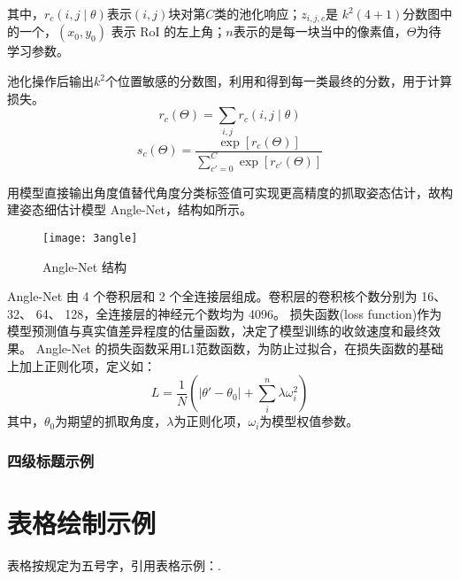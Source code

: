 其中，$r_c(i,j\mid\theta)$表示$ (i, j) $块对第$ C $类的池化响应；$z_{i,j,c}$是 $k^2(4 + 1)$分数图中的一个，$(x_0, y_0)$ 表示 RoI 的左上角；$n$表示的是每一块当中的像素值，$\Theta$为待学习参数。

池化操作后输出$k^2$个位置敏感的分数图，利用和得到每一类最终的分数，用于计算损失。
\begin{equation}
r_c(\Theta)=\sum_{i,j}r_c(i,j\mid\theta)
\label{eqrc}
\end{equation}
\begin{equation}
s_c(\Theta)=\dfrac{\exp[{r_c(\Theta)}]}{\sum\limits_{c'=0}^C\exp[{r_{c'}(\Theta)}]}
\label{eqsc}
\end{equation}

用模型直接输出角度值替代角度分类标签值可实现更高精度的抓取姿态估计，故构建姿态细估计模型 Angle-Net，结构如所示。

\begin{figure}[!htbp]
	\centering
	\texttt{[image: 3angle]}
	\caption{Angle-Net 结构}
     \label{figangle}
\end{figure}

Angle-Net 由 4 个卷积层和 2 个全连接层组成。卷积层的卷积核个数分别为 16、 32、 64、 128，全连接层的神经元个数均为 4096。 损失函数(loss function)作为模型预测值与真实值差异程度的估量函数，决定了模型训练的收敛速度和最终效果。 Angle-Net 的损失函数采用L1范数函数，为防止过拟合，在损失函数的基础上加上正则化项，定义如：
\begin{equation}
L=\frac{1}{N}\left(\Big|\theta'-\theta_0\Big|+\sum\limits_i^n\lambda\omega_i^2\right)
\label{eqnor}
\end{equation}
其中，$\theta_0$为期望的抓取角度，$\lambda$为正则化项，$\omega_i$为模型权值参数。

\subsubsection{四级标题示例}

\section{表格绘制示例}

表格按规定为五号字，引用表格示例：.

